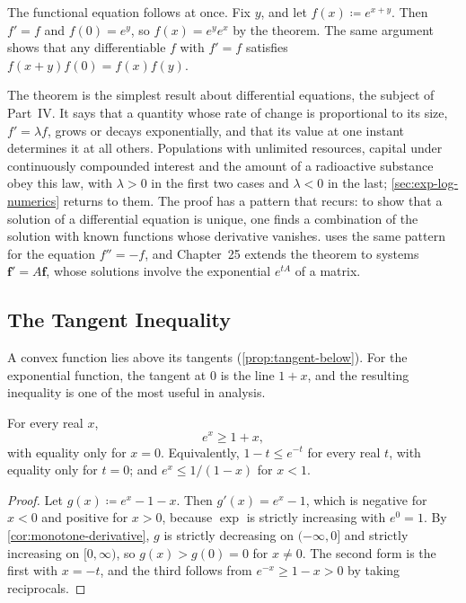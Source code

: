 The functional equation follows at once. Fix $y$, and let $f(x)\coloneqq e^{x+y}$. Then $f'=f$ and $f(0)=e^y$, so $f(x)=e^ye^x$ by the theorem. The same argument shows that any differentiable $f$ with $f'=f$ satisfies $f(x+y)f(0)=f(x)f(y)$.

The theorem is the simplest result about differential equations, the subject of Part~IV. It says that a quantity whose rate of change is proportional to its size, $f'=\lambda f$, grows or decays exponentially, and that its value at one instant determines it at all others. Populations with unlimited resources, capital under continuously compounded interest and the amount of a radioactive substance obey this law, with $\lambda>0$ in the first two cases and $\lambda<0$ in the last; \cref{sec:exp-log-numerics} returns to them. The proof has a pattern that recurs: to show that a solution of a differential equation is unique, one finds a combination of the solution with known functions whose derivative vanishes.  uses the same pattern for the equation $f''=-f$, and Chapter~25 extends the theorem to systems $\mathbf f'=A\mathbf f$, whose solutions involve the exponential $e^{tA}$ of a matrix.

\subsection{The Tangent Inequality}

A convex function lies above its tangents (\cref{prop:tangent-below}). For the exponential function, the tangent at $0$ is the line $1+x$, and the resulting inequality is one of the most useful in analysis.

\begin{proposition}
\label{prop:exp-tangent}
For every real $x$,
\[
e^x\ge1+x ,
\]
with equality only for $x=0$. Equivalently, $1-t\le e^{-t}$ for every real $t$, with equality only for $t=0$; and $e^x\le1/(1-x)$ for $x<1$.
\end{proposition}

\begin{proof}
Let $g(x)\coloneqq e^x-1-x$. Then $g'(x)=e^x-1$, which is negative for $x<0$ and positive for $x>0$, because $\exp$ is strictly increasing with $e^0=1$. By \cref{cor:monotone-derivative}, $g$ is strictly decreasing on $(-\infty,0]$ and strictly increasing on $[0,\infty)$, so $g(x)>g(0)=0$ for $x\ne0$. The second form is the first with $x=-t$, and the third follows from $e^{-x}\ge1-x>0$ by taking reciprocals.
\end{proof}

